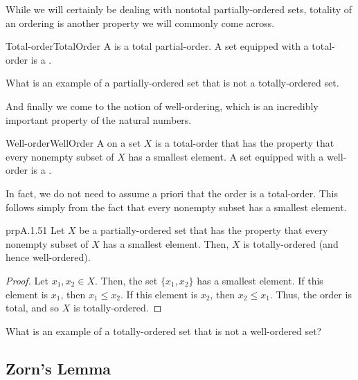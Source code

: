 While we will certainly be dealing with nontotal partially-ordered sets, totality of an ordering is another property we will commonly come across.
\begin{dfn}{Total-order}{TotalOrder}
A  is a total partial-order.  A set equipped with a total-order is a .
\end{dfn}
\begin{exr}{}{}
What is an example of a partially-ordered set that is not a totally-ordered set.
\end{exr}

And finally we come to the notion of well-ordering, which is an incredibly important property of the natural numbers.
\begin{dfn}{Well-order}{WellOrder}
A  on a set $X$ is a total-order that has the property that every nonempty subset of $X$ has a smallest element.  A set equipped with a well-order is a . 
\end{dfn}
In fact, we do not need to assume a priori that the order is a total-order.  This follows simply from the fact that every nonempty subset has a smallest element.
\begin{prp}{}{prpA.1.51}
Let $X$ be a partially-ordered set that has the property that every nonempty subset of $X$ has a smallest element.  Then, $X$ is totally-ordered (and hence well-ordered).
\begin{proof}
Let $x_1,x_2\in X$.  Then, the set $\{ x_1,x_2\}$ has a smallest element.  If this element is $x_1$, then $x_1\leq x_2$.  If this element is $x_2$, then $x_2\leq x_1$.  Thus, the order is total, and so $X$ is totally-ordered.
\end{proof}
\end{prp}
\begin{exr}{}{}
What is an example of a totally-ordered set that is not a well-ordered set?
\end{exr}

\subsection{Zorn's Lemma}

